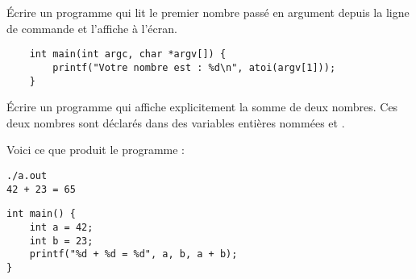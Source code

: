 \documentclass[french,a4paper,addpoints,11pt]{exam}
\begin{document}
\begin{questions}

\question Écrire un programme qui lit le premier nombre passé en argument depuis la ligne de commande et l'affiche à l'écran.

\ifprintanswers
\begin{solution}
    \begin{lstlisting}
    int main(int argc, char *argv[]) {
        printf("Votre nombre est : %d\n", atoi(argv[1]));
    }
    \end{lstlisting}
\end{solution}
\else
\fillwithdottedlines{4cm}
\fi

\question Écrire un programme qui affiche explicitement la somme de deux nombres. 
Ces deux nombres sont déclarés dans des variables entières nommées  et . 

Voici ce que produit le programme :

\begin{lstlisting}
./a.out 
42 + 23 = 65
\end{lstlisting}

\ifprintanswers
\begin{solution}
\begin{lstlisting}
int main() {
    int a = 42;
    int b = 23;
    printf("%d + %d = %d", a, b, a + b);
}
\end{lstlisting}
\end{solution}
\else
\fillwithdottedlines{4cm}
\fi

\end{questions}
\end{document}
